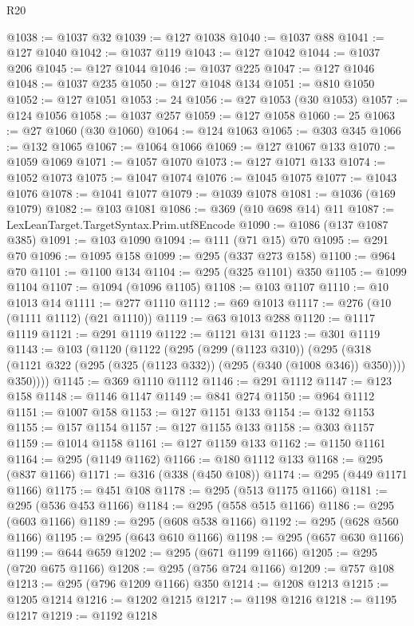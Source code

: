 \begin{lexlean}{R20}
\begin{coremodule}
{{{{{{{{{{{{{{{{{{{{{{{{{{{{{{{{{{{{{{{{{{{{{{{{{{{{{{{{{{{{{{{@1038 := @1037 @32
@1039 := @127 @1038
@1040 := @1037 @88
@1041 := @127 @1040
@1042 := @1037 @119
@1043 := @127 @1042
@1044 := @1037 @206
@1045 := @127 @1044
@1046 := @1037 @225
@1047 := @127 @1046
@1048 := @1037 @235
@1050 := @127 @1048 @134
@1051 := @810 @1050
@1052 := @127 @1051
@1053 := 24
@1056 := @27 @1053 (@30 @1053)
@1057 := @124 @1056
@1058 := @1037 @257
@1059 := @127 @1058
@1060 := 25
@1063 := @27 @1060 (@30 @1060)
@1064 := @124 @1063
@1065 := @303 @345
@1066 := @132 @1065
@1067 := @1064 @1066
@1069 := @127 @1067 @133
@1070 := @1059 @1069
@1071 := @1057 @1070
@1073 := @127 @1071 @133
@1074 := @1052 @1073
@1075 := @1047 @1074
@1076 := @1045 @1075
@1077 := @1043 @1076
@1078 := @1041 @1077
@1079 := @1039 @1078
@1081 := @1036 (@169 @1079)
@1082 := @103 @1081
@1086 := @369 (@10 @698 @14) @11
@1087 := LexLeanTarget.TargetSyntax.Prim.utf8Encode
@1090 := @1086 (@137 @1087 @385)
@1091 := @103 @1090
@1094 := @111 (@71 @15) @70
@1095 := @291 @70
@1096 := @1095 @158
@1099 := @295 (@337 @273 @158)
@1100 := @964 @70
@1101 := @1100 @134
@1104 := @295 (@325 @1101) @350
@1105 := @1099 @1104
@1107 := @1094 (@1096 @1105)
@1108 := @103 @1107
@1110 := @10 @1013 @14
@1111 := @277 @1110
@1112 := @69 @1013
@1117 := @276 (@10 (@1111 @1112) (@21 @1110))
@1119 := @63 @1013 @288
@1120 := @1117 @1119
@1121 := @291 @1119
@1122 := @1121 @131
@1123 := @301 @1119
@1143 := @103
    (@1120
      (@1122
        (@295
          (@299 (@1123 @310))
          (@295
            (@318 (@1121 @322 (@295 (@325 (@1123 @332)) (@295 (@340 (@1008 @346)) @350))))
            @350))))
@1145 := @369 @1110 @1112
@1146 := @291 @1112
@1147 := @123 @158
@1148 := @1146 @1147
@1149 := @841 @274
@1150 := @964 @1112
@1151 := @1007 @158
@1153 := @127 @1151 @133
@1154 := @132 @1153
@1155 := @157 @1154
@1157 := @127 @1155 @133
@1158 := @303 @1157
@1159 := @1014 @1158
@1161 := @127 @1159 @133
@1162 := @1150 @1161
@1164 := @295 (@1149 @1162)
@1166 := @180 @1112 @133
@1168 := @295 (@837 @1166)
@1171 := @316 (@338 (@450 @108))
@1174 := @295 (@449 @1171 @1166)
@1175 := @451 @108
@1178 := @295 (@513 @1175 @1166)
@1181 := @295 (@536 @453 @1166)
@1184 := @295 (@558 @515 @1166)
@1186 := @295 (@603 @1166)
@1189 := @295 (@608 @538 @1166)
@1192 := @295 (@628 @560 @1166)
@1195 := @295 (@643 @610 @1166)
@1198 := @295 (@657 @630 @1166)
@1199 := @644 @659
@1202 := @295 (@671 @1199 @1166)
@1205 := @295 (@720 @675 @1166)
@1208 := @295 (@756 @724 @1166)
@1209 := @757 @108
@1213 := @295 (@796 @1209 @1166) @350
@1214 := @1208 @1213
@1215 := @1205 @1214
@1216 := @1202 @1215
@1217 := @1198 @1216
@1218 := @1195 @1217
@1219 := @1192 @1218
}}}}}}}}}}}}}}}}}}}}}}}}}}}}}}}}}}}}}}}}}}}}}}}}}}}}}}}}}}}}}}}
\end{coremodule}
\end{lexlean}
